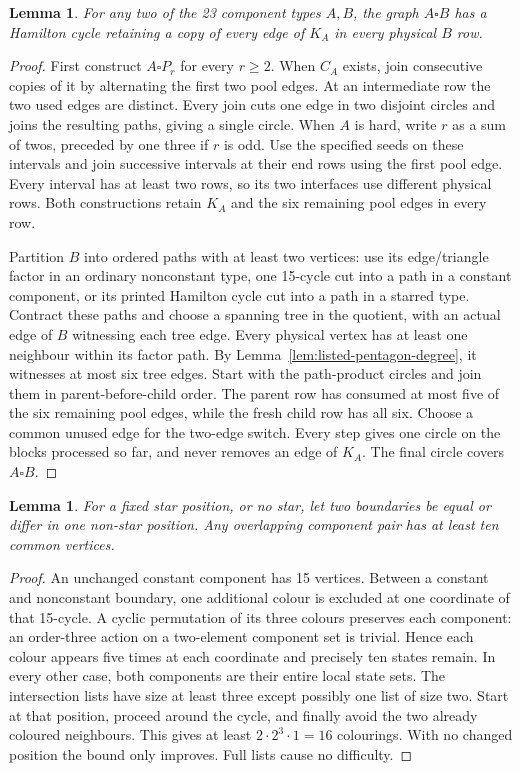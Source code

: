 \documentclass[11pt]{article}
\newtheorem{lemma}[theorem]{Lemma}
\theoremstyle{remark}
\numberwithin{equation}{section}
\begin{document}
\begin{lemma}\label{lem:protected-product}
For any two of the 23 component types $A,B$, the graph $A\square B$
has a Hamilton cycle retaining a copy of every edge of $K_A$
in every physical $B$ row.
\end{lemma}
\begin{proof}
First construct $A\square P_r$ for every $r\ge2$.
When $C_A$ exists, join consecutive copies of it by alternating the
first two pool edges. At an intermediate row the two used edges are
distinct. Every join cuts one edge in two disjoint circles and joins
the resulting paths, giving a single circle.
When $A$ is hard, write $r$ as a sum of twos, preceded by one three if
$r$ is odd. Use the specified seeds on these intervals and join
successive intervals at their end rows using the first pool edge.
Every interval has at least two rows, so its two interfaces use
different physical rows. Both constructions retain $K_A$ and the six
remaining pool edges in every row.

Partition $B$ into ordered paths with at least two vertices: use its
edge/triangle factor in an ordinary nonconstant type, one 15-cycle
cut into a path in a constant component, or its printed Hamilton
cycle cut into a path in a starred type.
Contract these paths and choose a spanning tree in the quotient,
with an actual edge of $B$ witnessing each tree edge.
Every physical vertex has at least one neighbour within its factor
path. By Lemma~\ref{lem:listed-pentagon-degree}, it witnesses at most
six tree edges. Start with the path-product circles and join them
in parent-before-child order. The parent row has consumed at most
five of the six remaining pool edges, while the fresh child row has
all six. Choose a common unused edge for the two-edge switch.
Every step gives one circle on the blocks processed so far, and
never removes an edge of $K_A$. The final circle covers $A\square B$.
\end{proof}

\begin{lemma}\label{lem:pentagon-overlap}
For a fixed star position, or no star, let two boundaries be equal or
differ in one non-star position. Any overlapping component pair has
at least ten common vertices.
\end{lemma}
\begin{proof}
An unchanged constant component has 15 vertices. Between a constant
and nonconstant boundary, one additional colour is excluded at one
coordinate of that 15-cycle. A cyclic permutation of its three colours
preserves each component: an order-three action on a two-element
component set is trivial. Hence each colour appears five times at
each coordinate and precisely ten states remain.
In every other case, both components are their entire local state
sets. The intersection lists have size at least three except possibly
one list of size two. Start at that position, proceed around the
cycle, and finally avoid the two already coloured neighbours.
This gives at least $2\cdot2^3\cdot1=16$ colourings. With no changed
position the bound only improves. Full lists cause no difficulty.
\end{proof}
\end{document}
